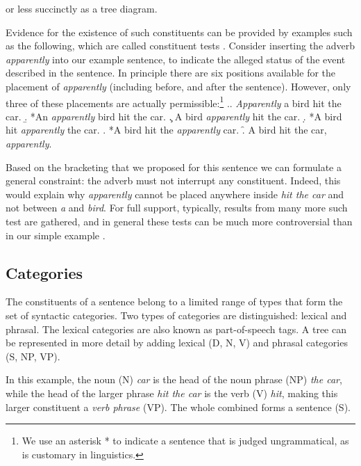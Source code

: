or less succinctly as a tree diagram.
\begin{figure}[h]{\textwidth}
  \center
  \label{fig:bird-tree}
\end{figure}
Evidence for the existence of such constituents can be provided by examples such as the following, which are called constituent tests \citep{carnie2010constituent}. Consider inserting the adverb \textit{apparently} into our example sentence, to indicate the alleged status of the event described in the sentence. In principle there are six positions available for the placement of \textit{apparently} (including before, and after the sentence). However, only three of these placements are actually permissible:\footnote{We use an asterisk * to indicate a sentence that is judged ungrammatical, as is customary in linguistics.}
\exi.\a. \textit{Apparently} a bird hit the car.
  \b. *An \textit{apparently} bird hit the car.
  \c. A bird \textit{apparently} hit the car.
  \d. *A bird hit \textit{apparently} the car.
  \e. *A bird hit the \textit{apparently} car.
  \f. A bird hit the car, \textit{apparently}.

Based on the bracketing that we proposed for this sentence we can formulate a general constraint: the adverb must not interrupt any constituent. Indeed, this would explain why \textit{apparently} cannot be placed anywhere inside \textit{hit the car} and not between \textit{a} and \textit{bird}. For full support, typically, results from many more such test are gathered, and in general these tests can be much more controversial than in our simple example \citep{carnie2010constituent}.

\subsection{Categories}
The constituents of a sentence belong to a limited range of types that form the set of syntactic categories. Two types of categories are distinguished: lexical and phrasal. The lexical categories are also known as part-of-speech tags. A tree can be represented in more detail by adding lexical (D, N, V) and phrasal categories (S, NP, VP).
\begin{figure}[h]{\textwidth}
  \center
\end{figure}
In this example, the noun (N) \textit{car} is the head of the noun phrase (NP) \textit{the car}, while the head of the larger phrase \textit{hit the car} is the verb (V) \textit{hit}, making this larger constituent a \textit{verb phrase} (VP). The whole combined forms a sentence (S).

